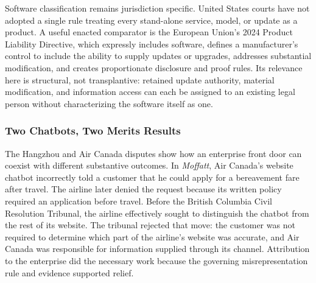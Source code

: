 Software classification remains jurisdiction specific. United States courts have not adopted a single rule treating every stand-alone service, model, or update as a product. A useful enacted comparator is the European Union's 2024 Product Liability Directive, which expressly includes software, defines a manufacturer's control to include the ability to supply updates or upgrades, addresses substantial modification, and creates proportionate disclosure and proof rules. Its relevance here is structural, not transplantive: retained update authority, material modification, and information access can each be assigned to an existing legal person without characterizing the software itself as one.

\subsubsection{Two Chatbots, Two Merits Results}

The Hangzhou and Air Canada disputes show how an enterprise front door can coexist with different substantive outcomes. In \emph{Moffatt}, Air Canada's website chatbot incorrectly told a customer that he could apply for a bereavement fare after travel. The airline later denied the request because its written policy required an application before travel. Before the British Columbia Civil Resolution Tribunal, the airline effectively sought to distinguish the chatbot from the rest of its website. The tribunal rejected that move: the customer was not required to determine which part of the airline's website was accurate, and Air Canada was responsible for information supplied through its channel. Attribution to the enterprise did the necessary work because the governing misrepresentation rule and evidence supported relief.

